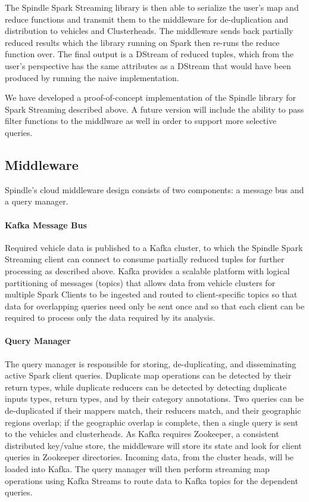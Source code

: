 \documentclass{thesis}
\begin{document}
    The Spindle Spark Streaming library is then able to serialize the user's map and reduce functions and transmit
    them to the middleware for de-duplication and distribution to vehicles and Clusterheads. The middleware
    sends back partially reduced results which the library running on Spark then re-runs the reduce function over.
    The final output is a DStream of reduced tuples, which from the user's perspective has the same attributes as 
    a DStream that would have been produced by running the naive implementation.

    We have developed a proof-of-concept implementation of the Spindle library for Spark Streaming described above.
    A future version will include the ability to pass filter functions to the middlware as well in order to support
    more selective queries.
\subsection{Middleware}
    Spindle's cloud middleware design consists of two components: a message bus and a query manager.
    \paragraph{Kafka Message Bus}
        Required vehicle data is published to a Kafka cluster, to which the Spindle Spark Streaming client can
        connect to consume partially reduced tuples for further processing as described above. Kafka provides
        a scalable platform with logical partitioning of messages (topics) that allows data from vehicle clusters
        for multiple Spark Clients to be ingested and routed to client-specific topics so that data for overlapping
        queries need only be sent once and so that each client can be required to process only the data required by
        its analysis.
    \paragraph{Query Manager}
        The query manager is responsible for storing, de-duplicating, and disseminating active Spark client queries.
        Duplicate map operations can be detected by their return types, while duplicate reducers can be detected
        by detecting duplicate inputs types, return types, and by their category annotations. Two queries can be
        de-duplicated if their mappers match, their reducers match, and their geographic regions overlap; if the
        geographic overlap is complete, then a single query is sent to the vehicles and clusterheads.
        As Kafka requires Zookeeper, a consistent distributed key/value store, the middleware will store its
        state and look for client queries in Zookeeper directories.
        Incoming data, from the cluster heads, will be loaded into Kafka. The query manager will then perform
        streaming map operations using Kafka Streams to route data to Kafka topics for the dependent queries.
\end{document}
